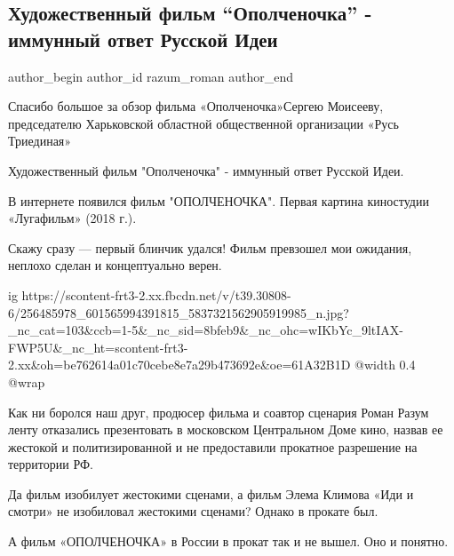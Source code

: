  
 
 
 
 
 
\subsection{Художественный фильм \enquote{Ополченочка} - иммунный ответ Русской Идеи}
\label{sec:17_11_2021.fb.razum_roman.1.opolchenochka}
 
\ifcmt
 author_begin
   author_id razum_roman
 author_end
\fi

Спасибо большое за обзор фильма «Ополченочка»Сергею Моисееву, председателю
Харьковской областной общественной организации «Русь Триединая» 

Художественный фильм "Ополченочка" - иммунный ответ Русской Идеи.

В интернете появился фильм "ОПОЛЧЕНОЧКА". Первая картина киностудии «Лугафильм»
(2018 г.). 

Скажу сразу — первый блинчик удался! Фильм превзошел мои ожидания, неплохо
сделан и концептуально верен. 

\ifcmt
  ig https://scontent-frt3-2.xx.fbcdn.net/v/t39.30808-6/256485978_601565994391815_5837321562905919985_n.jpg?_nc_cat=103&ccb=1-5&_nc_sid=8bfeb9&_nc_ohc=wIKbYc_9ltIAX-FWP5U&_nc_ht=scontent-frt3-2.xx&oh=be762614a01c70cebe8e7a29b473692e&oe=61A32B1D
  @width 0.4
  @wrap 
\fi

Как ни боролся наш друг, продюсер фильма и соавтор сценария Роман Разум ленту
отказались презентовать в московском Центральном Доме кино, назвав ее жестокой
и политизированной и не предоставили прокатное разрешение на территории РФ. 

Да фильм изобилует жестокими сценами, а фильм Элема Климова «Иди и смотри» не
изобиловал жестокими сценами? Однако в прокате был. 

А фильм «ОПОЛЧЕНОЧКА» в России в прокат так и не вышел. Оно и понятно. 

